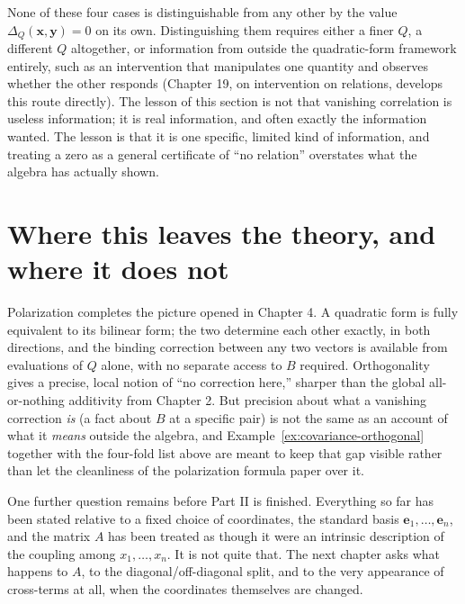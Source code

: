 \documentclass[11pt]{book}
\begin{document}
None of these four cases is distinguishable from any other by the value $\Delta_Q(\mathbf{x},\mathbf{y})=0$ on its own. Distinguishing them requires either a finer $Q$, a different $Q$ altogether, or information from outside the quadratic-form framework entirely, such as an intervention that manipulates one quantity and observes whether the other responds (Chapter 19, on intervention on relations, develops this route directly). The lesson of this section is not that vanishing correlation is useless information; it is real information, and often exactly the information wanted. The lesson is that it is one specific, limited kind of information, and treating a zero as a general certificate of ``no relation'' overstates what the algebra has actually shown.

\section{Where this leaves the theory, and where it does not}

Polarization completes the picture opened in Chapter 4. A quadratic form is fully equivalent to its bilinear form; the two determine each other exactly, in both directions, and the binding correction between any two vectors is available from evaluations of $Q$ alone, with no separate access to $B$ required. Orthogonality gives a precise, local notion of ``no correction here,'' sharper than the global all-or-nothing additivity from Chapter 2. But precision about what a vanishing correction \emph{is} (a fact about $B$ at a specific pair) is not the same as an account of what it \emph{means} outside the algebra, and Example~\ref{ex:covariance-orthogonal} together with the four-fold list above are meant to keep that gap visible rather than let the cleanliness of the polarization formula paper over it.

One further question remains before Part II is finished. Everything so far has been stated relative to a fixed choice of coordinates, the standard basis $\mathbf{e}_1,\ldots,\mathbf{e}_n$, and the matrix $A$ has been treated as though it were an intrinsic description of the coupling among $x_1,\ldots,x_n$. It is not quite that. The next chapter asks what happens to $A$, to the diagonal/off-diagonal split, and to the very appearance of cross-terms at all, when the coordinates themselves are changed.
\end{document}
